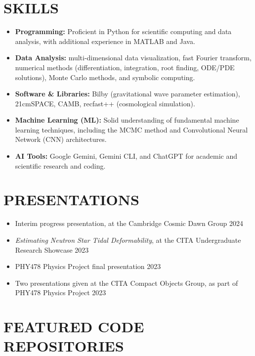 \documentclass[a4paper,10pt]{extarticle}
\begin{document}
\section*{SKILLS}
\begin{itemize}
    \item \textbf{Programming:} Proficient in Python for scientific computing and data analysis, with additional experience in MATLAB and Java.
    
    \item \textbf{Data Analysis:} multi-dimensional data visualization, fast Fourier transform, numerical methods (differentiation, integration, root finding, ODE/PDE solutions), Monte Carlo methods, and symbolic computing.
    
    \item \textbf{Software \& Libraries:} Bilby (gravitational wave parameter estimation), 21cmSPACE, CAMB, recfast++ (cosmological simulation).
    \item \textbf{Machine Learning (ML):} Solid understanding of fundamental machine learning techniques, including the MCMC method and Convolutional Neural Network (CNN) architectures. 
    
    \item \textbf{AI Tools:} Google Gemini, Gemini CLI, and ChatGPT for academic and scientific research and coding.
\end{itemize}

\section*{PRESENTATIONS}
\begin{itemize}
    \item Interim progress presentation, at the Cambridge Cosmic Dawn Group \hfill 2024

    \item \textit{Estimating Neutron Star Tidal Deformability}, at the CITA Undergraduate Research Showcase \hfill 2023

    \item PHY478 Physics Project final presentation \hfill 2023

    \item Two presentations given at the CITA Compact Objects Group, as part of PHY478 Physics Project \hfill 2023
\end{itemize}

\section*{FEATURED CODE REPOSITORIES}
\end{document}
